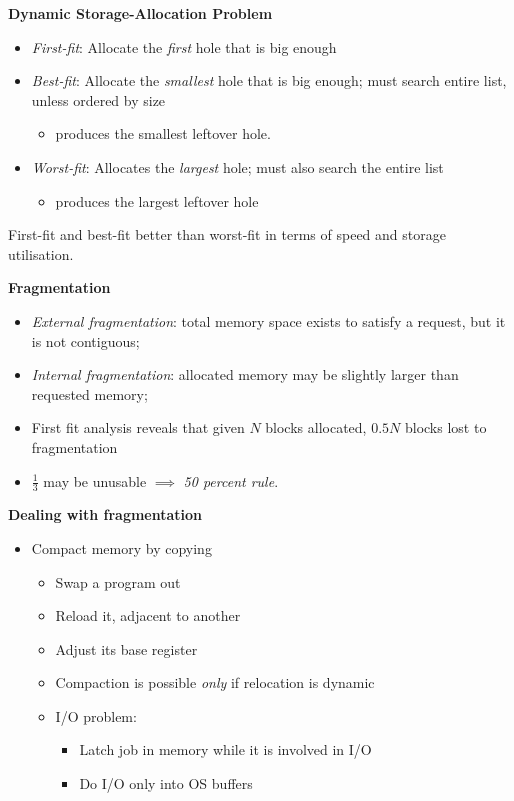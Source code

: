 \documentclass[11pt,a4paper]{article}
\begin{document}
\textbf{Dynamic Storage-Allocation Problem}
\begin{itemize}
    \item \emph{First-fit}: Allocate the \emph{first} hole that is big enough
    \item \emph{Best-fit}: Allocate the \emph{smallest} hole that is big enough;
        must search entire list, unless ordered by size
        \begin{itemize}
            \item produces the smallest leftover hole.
        \end{itemize}
    \item \emph{Worst-fit}: Allocates the \emph{largest} hole; must also search the entire list
        \begin{itemize}
            \item produces the largest leftover hole
        \end{itemize}
\end{itemize}
First-fit and best-fit better than worst-fit in terms of speed and storage utilisation.

\textbf{Fragmentation}
\begin{itemize}
    \item \emph{External fragmentation}: total memory space exists to satisfy a request,
        but it is not contiguous;
    \item \emph{Internal fragmentation}: allocated memory may be slightly larger than
        requested memory;
    \item First fit analysis reveals that given $N$ blocks allocated, $0.5N$ blocks lost
        to fragmentation
    \item $\frac{1}{3}$ may be unusable $\implies$ \emph{50 percent rule}.
\end{itemize}

\textbf{Dealing with fragmentation}
\begin{itemize}
    \item Compact memory by copying
        \begin{itemize}
            \item Swap a program out
            \item Reload it, adjacent to another
            \item Adjust its base register
            \item Compaction is possible \emph{only} if relocation is dynamic
            \item I/O problem:
                \begin{itemize}
                    \item Latch job in memory while it is involved in I/O
                    \item Do I/O only into OS buffers
                \end{itemize}
        \end{itemize}
\end{itemize}
\end{document}

